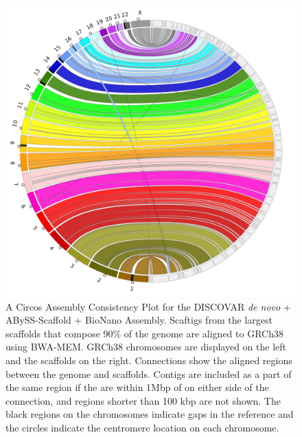 \documentclass[
  12pt,
  oneside,
  openany]{book}
\begin{document}
\begin{appendices}
\begin{figure}
\hypertarget{fig:jup4}{%
\centering
\includegraphics{abyss2-appendix/discovardenovo_abyss-scaffold_bionano.png}
\caption[A Circos Assembly Consistency Plot for the DISCOVAR \emph{de novo} + ABySS-Scaffold + BioNano Assembly.]{A Circos Assembly Consistency Plot for the DISCOVAR \emph{de novo} + ABySS-Scaffold + BioNano Assembly. Scaftigs from the largest scaffolds that compose 90\% of the genome are aligned to GRCh38 using BWA-MEM. GRCh38 chromosomes are displayed on the left and the scaffolds on the right. Connections show the aligned regions between the genome and scaffolds. Contigs are included as a part of the same region if the are within 1Mbp of on either side of the connection, and regions shorter than 100 kbp are not shown. The black regions on the chromosomes indicate gaps in the reference and the circles indicate the centromere location on each chromosome.}\label{fig:jup4}
}
\end{figure}


\end{appendices}
\end{document}
